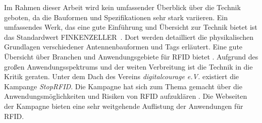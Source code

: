 Im Rahmen dieser Arbeit wird kein umfassender Überblick über die Technik geboten, da die Bauformen und Spezifikationen sehr stark variieren. Ein umfassendes Werk, das eine gute Einführung und Übersicht zur Technik bietet ist das Standardwert FINKENZELLER~\cite{finkenzeller2008rfid}. Dort werden detailliert die physikalischen Grundlagen verschiedener Antennenbauformen und Tags erläutert. Eine gute Übersicht über Branchen und Anwendungsgebiete für RFID bietet \cite{RFIDJournal}. Aufgrund des großen Anwendungsspektrums und der weiten Verbreitung ist die Technik in die Kritik geraten. Unter dem Dach des Vereins \textit{digitalcourage e.V.} existiert die Kampange \textit{StopRFID}. Die Kampagne hat sich zum Thema gemacht über die Anwendungsmöglichkeiten und Risiken von RFID aufzuklären \cite{stoprfid2013}. Die Webseiten der Kampagne bieten eine sehr weitgehende Auflistung der Anwendungen für RFID.\\
%
